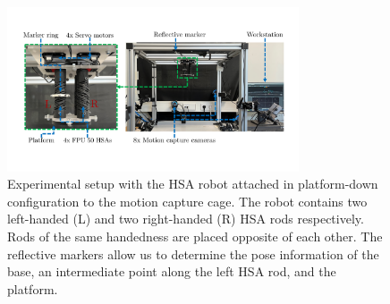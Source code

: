 
\begin{figure}
    \centering
    \includegraphics[width=0.77\textwidth]{hsamodel/figures/experimental_setup/experimental_setup_v3_compressed.pdf}
    \caption{Experimental setup with the \gls{HSA} robot attached in platform-down configuration to the motion capture cage. The robot contains two left-handed (L) and two right-handed (R) \gls{HSA} rods respectively. Rods of the same handedness are placed opposite of each other. The reflective markers allow us to determine the pose information of the base, an intermediate point along the left \gls{HSA} rod, and the platform.}\label{fig:hsamodel:experimental_setup}
\end{figure}



